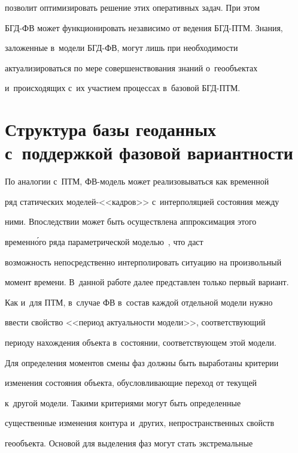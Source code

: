 позволит оптимизировать решение этих оперативных задач. При этом  


БГД-ФВ может функционировать независимо от ведения БГД-ПТМ. Знания, 


заложенные в~модели БГД-ФВ, могут лишь при не\-об\-хо\-ди\-мости 


актуализироваться по мере совершенствования знаний о~геообъектах 


и~происходящих с~их участием процессах в~базовой БГД-ПТМ.





     \section{Структура базы геоданных с~поддержкой фазовой вариантности}


     


  По аналогии с~ПТМ, ФВ-модель может реализовываться как временной 


ряд статических мо\-де\-лей-<<кад\-ров>> с~интерполяцией со\-сто\-яния между 


ними. Впоследствии может быть осуществлена аппроксимация этого 


временн\'{о}го ряда па\-ра\-мет\-ри\-че\-ской моделью~\cite{9-nik}, что даст 


возможность непосредственно интерполировать ситуацию на произвольный 


момент времени. В~данной работе далее пред\-став\-лен только первый вариант.


  


  Как и~для ПТМ, в~случае ФВ в~состав каждой отдельной модели нужно 


ввести свойство <<период актуальности модели>>, со\-от\-вет\-ст\-ву\-ющий 


периоду на\-хож\-де\-ния объекта в~со\-сто\-янии, со\-от\-вет\-ст\-ву\-ющем этой модели. 


Для определения моментов смены фаз должны быть выработаны критерии 


изменения со\-сто\-яния объекта, обуслов\-ли\-ва\-ющие переход от текущей 


к~другой модели. Такими критериями могут быть определенные 


существенные изменения контура и~других, непространственных свойств 


геообъекта. Основой для выделения фаз могут стать экстремальные 


